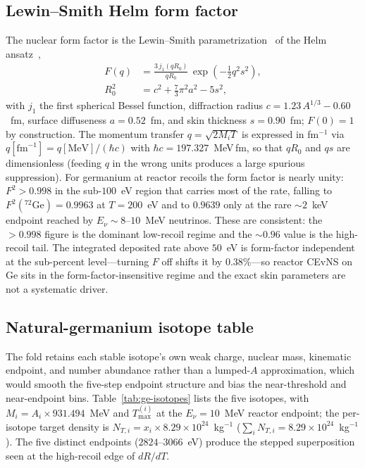 \subsection{Lewin--Smith Helm form factor}

The nuclear form factor is the Lewin--Smith parametrization~\cite{lewinsmith1996} of the Helm ansatz~\cite{helm1956},
\begin{equation}
\begin{aligned}
F(q) &= \frac{3\, j_1(qR_0)}{qR_0}\,\exp\!\left(-\tfrac12 q^2 s^2\right),\\
R_0^2 &= c^2 + \tfrac{7}{3}\pi^2 a^2 - 5 s^2 ,
\end{aligned}
\label{eq:helm}
\end{equation}
with $j_1$ the first spherical Bessel function, diffraction radius $c=1.23\,A^{1/3}-0.60$~fm, surface diffuseness $a=0.52$~fm, and skin thickness $s=0.90$~fm; $F(0)=1$ by construction. The momentum transfer $q=\sqrt{2M_iT}$ is expressed in fm$^{-1}$ via $q[\mathrm{fm}^{-1}]=q[\mathrm{MeV}]/(\hbar c)$ with $\hbar c=197.327$~MeV\,fm, so that $qR_0$ and $qs$ are dimensionless (feeding $q$ in the wrong units produces a large spurious suppression). For germanium at reactor recoils the form factor is nearly unity: $F^2>0.998$ in the sub-$100$~eV region that carries most of the rate, falling to $F^2({}^{72}\mathrm{Ge})=0.9963$ at $T=200$~eV and to $0.9639$ only at the rare $\sim\!2$~keV endpoint reached by $E_\nu\sim8$--$10$~MeV neutrinos. These are consistent: the $>0.998$ figure is the dominant low-recoil regime and the $\sim\!0.96$ value is the high-recoil tail. The integrated deposited rate above $50$~eV is form-factor independent at the sub-percent level---turning $F$ off shifts it by $0.38\%$---so reactor CEvNS on Ge sits in the form-factor-insensitive regime and the exact skin parameters are not a systematic driver.

\subsection{Natural-germanium isotope table}

The fold retains each stable isotope's own weak charge, nuclear mass, kinematic endpoint, and number abundance rather than a lumped-$A$ approximation, which would smooth the five-step endpoint structure and bias the near-threshold and near-endpoint bins. Table~\ref{tab:ge-isotopes} lists the five isotopes, with $M_i=A_i\times931.494$~MeV and $T_{\max}^{(i)}$ at the $E_\nu=10$~MeV reactor endpoint; the per-isotope target density is $N_{T,i}=x_i\times8.29\times10^{24}$~kg$^{-1}$ ($\sum_i N_{T,i}=8.29\times10^{24}$~kg$^{-1}$). The five distinct endpoints ($2824$--$3066$~eV) produce the stepped superposition seen at the high-recoil edge of $dR/dT$.

